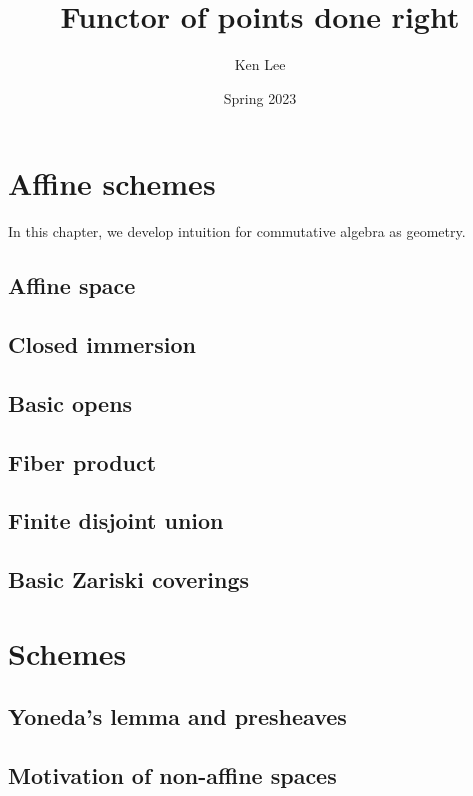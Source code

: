 \documentclass{article}
\begin{document}
\title{Functor of points done right}

\author{Ken Lee}
\date{Spring 2023}
\maketitle

\tableofcontents



\section{Affine schemes}
  In this chapter, we develop intuition 
  for commutative algebra as geometry.
  \subsection{Affine space}
  \subsection{Closed immersion}
  \subsection{Basic opens}
  \subsection{Fiber product}
  \subsection{Finite disjoint union}
  \subsection{Basic Zariski coverings}
  

\section{Schemes}
  \subsection{Yoneda's lemma and presheaves}
  \subsection{Motivation of non-affine spaces}
    
\end{document}
